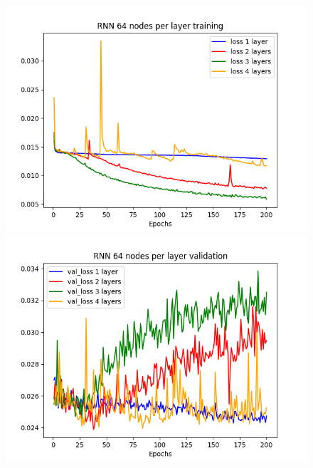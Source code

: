 \documentclass[11pt]
{article}
\begin{document}
\begin{figure}[ht] 
\hspace*{-2cm}  
	\begin{minipage}[b]{0.33\linewidth}
		\centering
		\includegraphics[width=\linewidth]{../TESTS_RESULTS/RNN_tests/plots/64_training.png} 
	\end{minipage}%
	\begin{minipage}[b]{0.33\linewidth}
		\centering
		\includegraphics[width=\linewidth]{../TESTS_RESULTS/RNN_tests/plots/64_validation.png} 
	\end{minipage} 
	\begin{minipage}[b]{0.33\linewidth}
		\centering

\end{minipage}
\end{figure}
\end{document}
